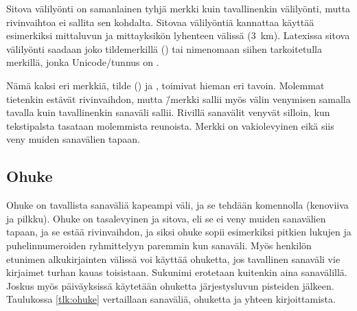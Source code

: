 Sitova välilyönti on samanlainen tyhjä merkki kuin tavallinenkin
välilyönti, mutta rivinvaihtoa ei sallita sen kohdalta. Sitovaa
välilyöntiä kannattaa käyttää esimerkiksi mittaluvun ja mittayksikön
lyhenteen välissä (3~km). Latexissa sitova välilyönti saadaan joko
tildemerkillä (\koodi{\textasciitilde}) tai nimenomaan siihen
tarkoitetulla merkillä, jonka Unicode\-/tunnus on .

Nämä kaksi eri merkkiä, tilde (\koodi{\textasciitilde}) ja
, toimivat hieman eri tavoin. Molemmat tietenkin estävät
rivinvaihdon, mutta \koodi{\textasciitilde}\=/merkki sallii myös välin
venymisen samalla tavalla kuin tavallinenkin sanaväli sallii. Rivillä
sanavälit venyvät silloin, kun tekstipalsta tasataan molemmista
reunoista. Merkki  on vakiolevyinen eikä siis veny
muiden sanavälien tapaan.

\subsection{Ohuke}

Ohuke on tavallista sanaväliä kapeampi väli, ja se tehdään komennolla
\koodi{\keno,} (kenoviiva ja pilkku). Ohuke on tasalevyinen ja sitova,
eli se ei veny muiden sanavälien tapaan, ja se estää rivinvaihdon, ja
siksi ohuke sopii esimerkiksi pitkien lukujen ja puhelinnumeroiden
ryhmittelyyn paremmin kun sanaväli. Myös henkilön etunimen
alkukirjainten välissä voi käyttää ohuketta, jos tavallinen sanaväli vie
kirjaimet turhan kauas toisistaan. Sukunimi erotetaan kuitenkin aina
sanavälillä. Joskus myös päiväyksissä käytetään ohuketta järjestysluvun
pisteiden jälkeen. Taulukossa \ref{tlk:ohuke} vertaillaan sanaväliä,
ohuketta ja yhteen kirjoittamista.


